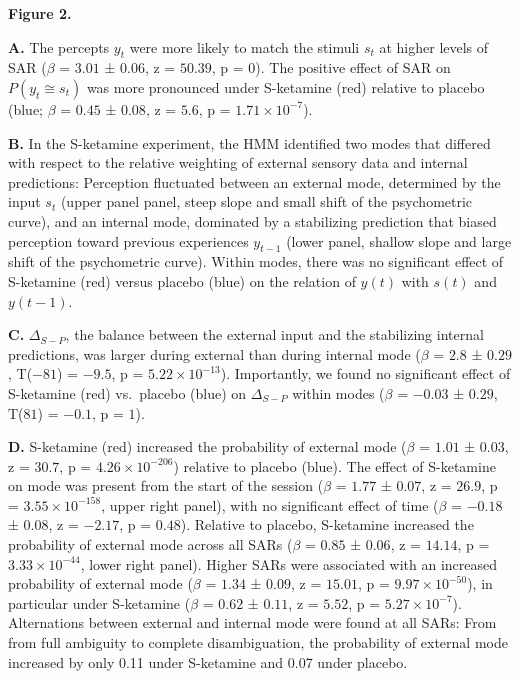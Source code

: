 \documentclass[
]{article}
\begin{document}
\textbf{Figure 2.}

\textbf{A.} The percepts \(y_t\) were more likely to match the stimuli
\(s_t\) at higher levels of SAR (\(\beta\) = \(3.01\) ± \(0.06\), z =
\(50.39\), p = \(0\)). The positive effect of SAR on
\(P(y_t \cong s_t)\) was more pronounced under S-ketamine (red) relative
to placebo (blue; \(\beta\) = \(0.45\) ± \(0.08\), z = \(5.6\), p =
\(\ensuremath{1.71\times 10^{-7}}\)).

\textbf{B.} In the S-ketamine experiment, the HMM identified two modes
that differed with respect to the relative weighting of external sensory
data and internal predictions: Perception fluctuated between an external
mode, determined by the input \(s_t\) (upper panel panel, steep slope
and small shift of the psychometric curve), and an internal mode,
dominated by a stabilizing prediction that biased perception toward
previous experiences \(y_{t-1}\) (lower panel, shallow slope and large
shift of the psychometric curve). Within modes, there was no significant
effect of S-ketamine (red) versus placebo (blue) on the relation of
\(y(t)\) with \(s(t)\) and \(y(t-1)\).

\textbf{C.} \(\Delta_{S-P}\), the balance between the external input and
the stabilizing internal predictions, was larger during external than
during internal mode (\(\beta\) = \(2.8\) ± \(0.29\), T(\(-81\)) =
\(-9.5\), p = \(\ensuremath{5.22\times 10^{-13}}\)). Importantly, we
found no significant effect of S-ketamine (red) vs.~placebo (blue) on
\(\Delta_{S-P}\) within modes (\(\beta\) = \(-0.03\) ± \(0.29\),
T(\(81\)) = \(-0.1\), p = \(1\)).

\textbf{D.} S-ketamine (red) increased the probability of external mode
(\(\beta\) = \(1.01\) ± \(0.03\), z = \(30.7\), p =
\(\ensuremath{4.26\times 10^{-206}}\)) relative to placebo (blue). The
effect of S-ketamine on mode was present from the start of the session
(\(\beta\) = \(1.77\) ± \(0.07\), z = \(26.9\), p =
\(\ensuremath{3.55\times 10^{-158}}\), upper right panel), with no
significant effect of time (\(\beta\) = \(-0.18\) ± \(0.08\), z =
\(-2.17\), p = \(0.48\)). Relative to placebo, S-ketamine increased the
probability of external mode across all SARs (\(\beta\) = \(0.85\) ±
\(0.06\), z = \(14.14\), p = \(\ensuremath{3.33\times 10^{-44}}\), lower
right panel). Higher SARs were associated with an increased probability
of external mode (\(\beta\) = \(1.34\) ± \(0.09\), z = \(15.01\), p =
\(\ensuremath{9.97\times 10^{-50}}\)), in particular under S-ketamine
(\(\beta\) = \(0.62\) ± \(0.11\), z = \(5.52\), p =
\(\ensuremath{5.27\times 10^{-7}}\)). Alternations between external and
internal mode were found at all SARs: From from full ambiguity to
complete disambiguation, the probability of external mode increased by
only 0.11 under S-ketamine and 0.07 under placebo.
\end{document}
